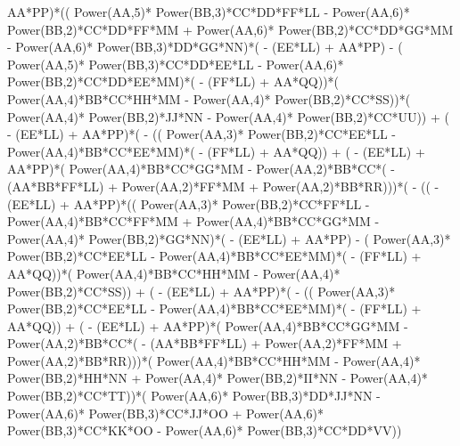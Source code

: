 \documentclass[10pt]{article} %
\begin{document}
AA*PP)*(( Power(AA,5)* Power(BB,3)*CC*DD*FF*LL -  Power(AA,6)* Power(BB,2)*CC*DD*FF*MM +  Power(AA,6)* Power(BB,2)*CC*DD*GG*MM -  Power(AA,6)* Power(BB,3)*DD*GG*NN)*( - (EE*LL) + AA*PP) - ( Power(AA,5)* Power(BB,3)*CC*DD*EE*LL -  Power(AA,6)* Power(BB,2)*CC*DD*EE*MM)*( - (FF*LL) + AA*QQ))*( Power(AA,4)*BB*CC*HH*MM -  Power(AA,4)* Power(BB,2)*CC*SS))*( Power(AA,4)* Power(BB,2)*JJ*NN -  Power(AA,4)* Power(BB,2)*CC*UU)) + ( - (EE*LL) + AA*PP)*( - (( Power(AA,3)* Power(BB,2)*CC*EE*LL -  Power(AA,4)*BB*CC*EE*MM)*( - (FF*LL) + AA*QQ)) + ( - (EE*LL) + AA*PP)*( Power(AA,4)*BB*CC*GG*MM -  Power(AA,2)*BB*CC*( - (AA*BB*FF*LL) +  Power(AA,2)*FF*MM +  Power(AA,2)*BB*RR)))*( - (( - (EE*LL) + AA*PP)*(( Power(AA,3)* Power(BB,2)*CC*FF*LL -  Power(AA,4)*BB*CC*FF*MM +  Power(AA,4)*BB*CC*GG*MM -  Power(AA,4)* Power(BB,2)*GG*NN)*( - (EE*LL) + AA*PP) - ( Power(AA,3)* Power(BB,2)*CC*EE*LL -  Power(AA,4)*BB*CC*EE*MM)*( - (FF*LL) + AA*QQ))*( Power(AA,4)*BB*CC*HH*MM -  Power(AA,4)* Power(BB,2)*CC*SS)) + ( - (EE*LL) + AA*PP)*( - (( Power(AA,3)* Power(BB,2)*CC*EE*LL -  Power(AA,4)*BB*CC*EE*MM)*( - (FF*LL) + AA*QQ)) + ( - (EE*LL) + AA*PP)*( Power(AA,4)*BB*CC*GG*MM -  Power(AA,2)*BB*CC*( - (AA*BB*FF*LL) +  Power(AA,2)*FF*MM +  Power(AA,2)*BB*RR)))*( Power(AA,4)*BB*CC*HH*MM -  Power(AA,4)* Power(BB,2)*HH*NN +  Power(AA,4)* Power(BB,2)*II*NN -  Power(AA,4)* Power(BB,2)*CC*TT))*( Power(AA,6)* Power(BB,3)*DD*JJ*NN -  Power(AA,6)* Power(BB,3)*CC*JJ*OO +  Power(AA,6)* Power(BB,3)*CC*KK*OO -  Power(AA,6)* Power(BB,3)*CC*DD*VV))

\end{document}
